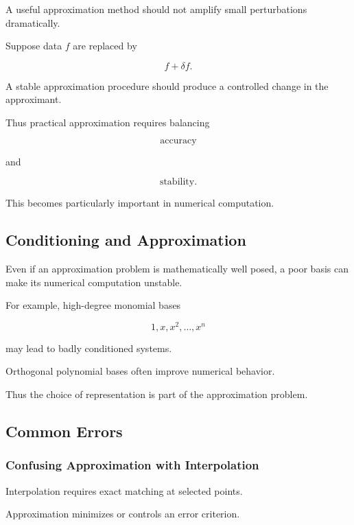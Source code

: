 A useful approximation method should not amplify small perturbations
dramatically.

Suppose data \(f\) are replaced by

\[
f+\delta f.
\]

A stable approximation procedure should produce a controlled change in
the approximant.

Thus practical approximation requires balancing

\[
\boxed{
\text{accuracy}
}
\]

and

\[
\boxed{
\text{stability}.
}
\]

This becomes particularly important in numerical computation.

\subsection{Conditioning and Approximation}
\label{subsec:conditioning-approximation}

Even if an approximation problem is mathematically well posed, a poor
basis can make its numerical computation unstable.

For example, high-degree monomial bases

\[
1,x,x^2,\ldots,x^n
\]

may lead to badly conditioned systems.

Orthogonal polynomial bases often improve numerical behavior.

Thus the choice of representation is part of the approximation problem.

\subsection{Common Errors}
\label{subsec:approximation-theory-common-errors}

\subsubsection{Confusing Approximation with Interpolation}

Interpolation requires exact matching at selected points.

Approximation minimizes or controls an error criterion.

